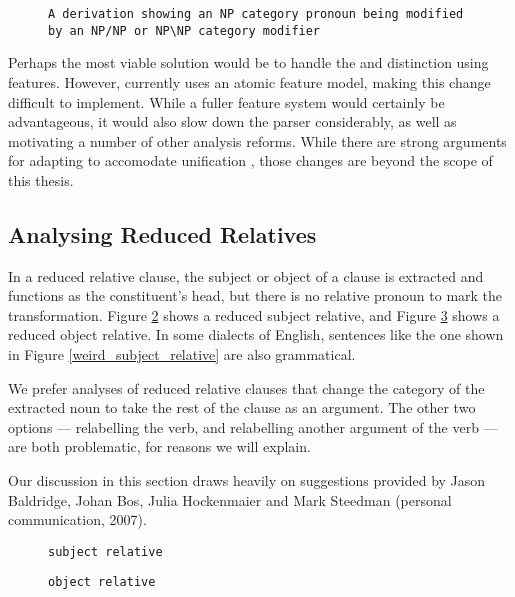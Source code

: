 \begin{figure}
\begin{verbatim}
A derivation showing an NP category pronoun being modified by an NP/NP or NP\NP category modifier
\end{verbatim}
\label{pro_mod}
\end{figure}

Perhaps the most viable solution would be to handle the  and  distinction using features. However, \ccgbank currently uses an atomic feature model, making this change difficult to implement. While a fuller feature system would certainly be advantageous, it would also slow down the parser considerably, as well as motivating a number of other analysis reforms. While there are strong arguments for adapting \ccgbank to accomodate unification \ccg \citet{uccg}, those changes are beyond the scope of this thesis.

\subsection{Analysing Reduced Relatives}

In a reduced relative clause, the subject or object of a clause is extracted and functions as the constituent's head, but there is no relative pronoun to mark the transformation. Figure \ref{subject_relative} shows a reduced subject relative, and Figure \ref{object_relative} shows a reduced object relative. In some dialects of English, sentences like the one shown in Figure \ref{weird_subject_relative} are also grammatical.

We prefer analyses of reduced relative clauses that change the category of the extracted noun to take the rest of the clause as an argument. The other two options --- relabelling the verb, and relabelling another argument of the verb --- are both problematic, for reasons we will explain.
 
 Our discussion in this section draws heavily on suggestions provided by Jason Baldridge, Johan Bos, Julia Hockenmaier and Mark Steedman (personal communication, 2007).

\begin{figure}
\begin{verbatim}
subject relative
\end{verbatim}
\label{subject_relative}
\end{figure}

\begin{figure}
\begin{verbatim}
object relative
\end{verbatim}
\label{object_relative}
\end{figure}

